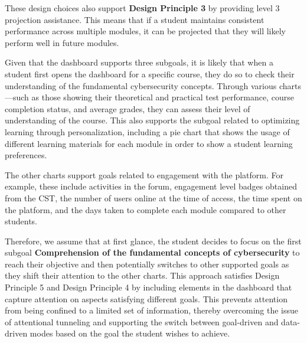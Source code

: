 These design choices also support \textbf{Design Principle 3} by providing level 3 projection assistance. This means that if a student maintains consistent performance across multiple modules, it can be projected that they will likely perform well in future modules. 

Given that the dashboard supports three subgoals, it is likely that when a student first opens the dashboard for a specific course, they do so to check their understanding of the fundamental cybersecurity concepts. Through various charts—such as those showing their theoretical and practical test performance, course completion status, and average grades, they can assess their level of understanding of the course. 
This also supports the subgoal related to optimizing learning through personalization, including a pie chart that shows the usage of different learning materials for each module in order to show a student learning preferences. 

The other charts support goals related to engagement with the platform. For example, these include activities in the forum, engagement level badges obtained from the CST, the number of users online at the time of access, the time spent on the platform, and the days taken to complete each module compared to other students.

Therefore, we assume that at first glance, the student decides to focus on the first subgoal \textbf{Comprehension of the fundamental concepts of cybersecurity} to reach their objective and then potentially switches to other supported goals as they shift their attention to the other charts. This approach satisfies Design Principle 5 and Design Principle 4 by including elements in the dashboard that capture attention on aspects satisfying different goals. This prevents attention from being confined to a limited set of information, thereby overcoming the issue of attentional tunneling and supporting the switch between goal-driven and data-driven modes based on the goal the student wishes to achieve.


